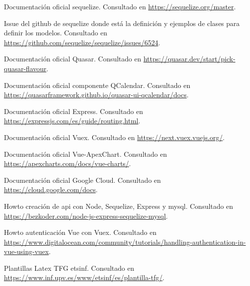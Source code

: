 \documentclass[11pt,spanish,listoffigures,listoftables]{tfgetsinf}
\begin{document}

\begin{thebibliography}{10}

   Documentación oficial sequelize.
   \newblock Consultado en 
   \url{https://sequelize.org/master}.

   Issue del github de sequelize donde está la definición y ejemplos de clases para definir los modelos.
   \newblock Consultado en
   \url{https://github.com/sequelize/sequelize/issues/6524}.

   Documentación oficial Quasar.
   \newblock Consultado en 
   \url{https://quasar.dev/start/pick-quasar-flavour}.

   Documentación oficial componente QCalendar.
   \newblock Consultado en 
   \url{https://quasarframework.github.io/quasar-ui-qcalendar/docs}.

   Documentación oficial Express.
   \newblock Consultado en 
   \url{https://expressjs.com/es/guide/routing.html}.

  Documentación oficial Vuex.
   \newblock Consultado en 
   \url{https://next.vuex.vuejs.org/}.

   Documentación oficial Vue-ApexChart.
    \newblock Consultado en 
    \url{https://apexcharts.com/docs/vue-charts/}.

   Documentación oficial Google Cloud.
    \newblock Consultado en 
    \url{https://cloud.google.com/docs}.

   Howto creación de api con Node, Sequelize, Express y mysql.
   \newblock Consultado en
   \url{https://bezkoder.com/node-js-express-sequelize-mysql}.

   Howto autenticación Vue con Vuex.
   \newblock Consultado en
   \url{https://www.digitalocean.com/community/tutorials/handling-authentication-in-vue-using-vuex}.

   Plantillas Latex TFG etsinf.
   \newblock Consultado en
   \url{https://www.inf.upv.es/www/etsinf/es/plantilla-tfg/}.

   

\end{thebibliography}
\cleardoublepage
\end{document}
